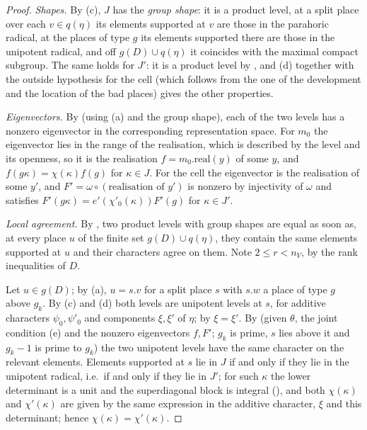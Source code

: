 \begin{proof}
\emph{Shapes.} By (c), $J$ has the \emph{group shape}: it is a product level, at a split place over each $v\in
q(\eta)$ its elements supported at $v$ are those in the parahoric radical, at the places of type $g$ its elements
supported there are those in the unipotent radical, and off $g(D)\cup q(\eta)$ it coincides with the maximal compact
subgroup. The same holds for $J'$: it is a product level by
, and (d) together with the outside
hypothesis for the cell (which follows from the one of the development and the location of the bad places)
gives the other properties.

\emph{Eigenvectors.} By  (using (a) and the group shape), each of the two
levels has a nonzero eigenvector in the corresponding representation space. For $m_0$ the eigenvector lies in
the range of the realisation, which is described by the level and its openness, so it is the realisation
$f=m_0.\mathrm{real}(y)$ of some $y$, and $f(g\kappa)=\chi(\kappa)f(g)$ for $\kappa\in J$. For the cell the eigenvector is
the realisation of some $y'$, and $F'=\omega\circ(\text{realisation of }y')$ is nonzero by injectivity of $\omega$ and
satisfies $F'(g\kappa)=e'(\chi'_0(\kappa))F'(g)$ for $\kappa\in J'$.

\emph{Local agreement.} By , two product levels
with group shapes are equal as soon as, at every place $u$ of the finite set $g(D)\cup q(\eta)$, they contain the
same elements supported at $u$ and their characters agree on them. Note $2\le r<n_V$, by the rank inequalities
of $D$.

Let $u\in g(D)$; by (a), $u=s.v$ for a split place $s$ with $s.w$ a place of type $g$ above $g_k$. By (c) and (d) both
levels are unipotent levels at $s$, for additive characters $\psi_0,\psi'_0$ and components $\xi,\xi'$ of $\eta$; by
 $\xi=\xi'$. By
 (given $\theta$, the joint
condition (e) and the nonzero eigenvectors $f,F'$; $g_k$ is prime, $s$ lies above it and $g_k-1$ is prime to $g_k$)
the two unipotent levels have the same character on the relevant elements. Elements supported at $s$ lie in $J$ if
and only if they lie in the unipotent radical, i.e.\ if and only if they lie in $J'$; for such $\kappa$ the lower
determinant is a unit and the superdiagonal block is integral
(), and both $\chi(\kappa)$ and
$\chi'(\kappa)$ are given by the same expression in the additive character, $\xi$ and this determinant; hence
$\chi(\kappa)=\chi'(\kappa)$.


\end{proof}
